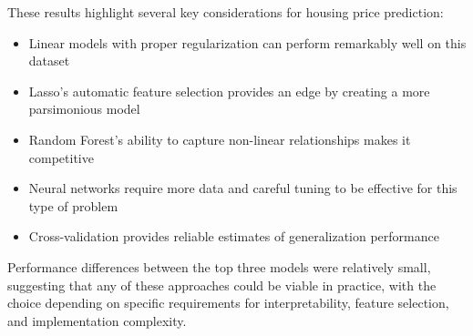 These results highlight several key considerations for housing price prediction:
\begin{itemize}
    \item Linear models with proper regularization can perform remarkably well on this dataset
    \item Lasso's automatic feature selection provides an edge by creating a more parsimonious model
    \item Random Forest's ability to capture non-linear relationships makes it competitive
    \item Neural networks require more data and careful tuning to be effective for this type of problem
    \item Cross-validation provides reliable estimates of generalization performance
\end{itemize}

Performance differences between the top three models were relatively small, suggesting that any of these approaches could be viable in practice, with the choice depending on specific requirements for interpretability, feature selection, and implementation complexity.

